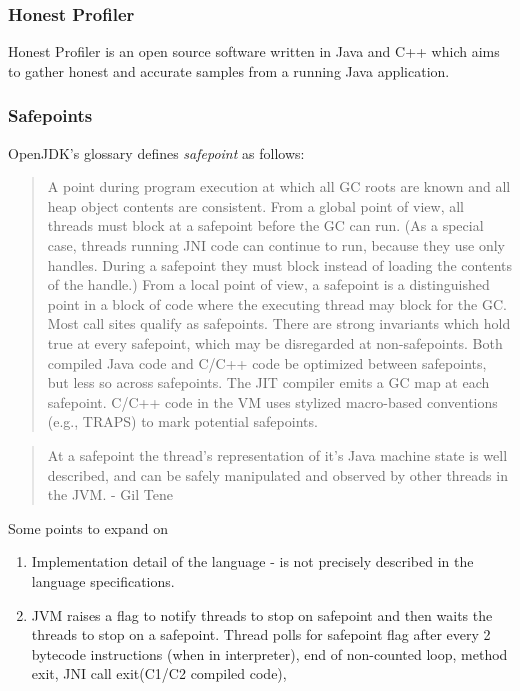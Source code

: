 \documentclass[..thesis.tex]{subfiles}
\begin{document}
\subsubsection{Honest Profiler}
Honest Profiler \cite{hon_prof} is an open source software written in Java and C++ which aims to gather honest and accurate samples from a running Java application. 


\subsubsection{Safepoints}

OpenJDK's glossary \cite{jdk_glossary} defines \textit{safepoint} as follows: 
\begin{quote}
A point during program execution at which all GC roots are known and all heap object contents are consistent. From a global point of view, all threads must block at a safepoint before the GC can run. (As a special case, threads running JNI code can continue to run, because they use only handles. During a safepoint they must block instead of loading the contents of the handle.) From a local point of view, a safepoint is a distinguished point in a block of code where the executing thread may block for the GC. Most call sites qualify as safepoints. There are strong invariants which hold true at every safepoint, which may be disregarded at non-safepoints. Both compiled Java code and C/C++ code be optimized between safepoints, but less so across safepoints. The JIT compiler emits a GC map at each safepoint. C/C++ code in the VM uses stylized macro-based conventions (e.g., TRAPS) to mark potential safepoints.
\end{quote}

\begin{quote}
At a safepoint the thread's representation of it's Java machine state is well described, and can be safely manipulated and observed by other threads in the JVM. - Gil Tene
\end{quote}

Some points to expand on
\begin{enumerate}
	\item Implementation detail of the language - is not precisely described in the language specifications.
	\item JVM raises a flag to notify threads to stop on safepoint and then waits the threads to stop on a safepoint. Thread polls for safepoint flag after every 2 bytecode instructions (when in interpreter), end of non-counted loop, method exit, JNI call exit(C1/C2 compiled code), 
\end{enumerate}
\end{document}
